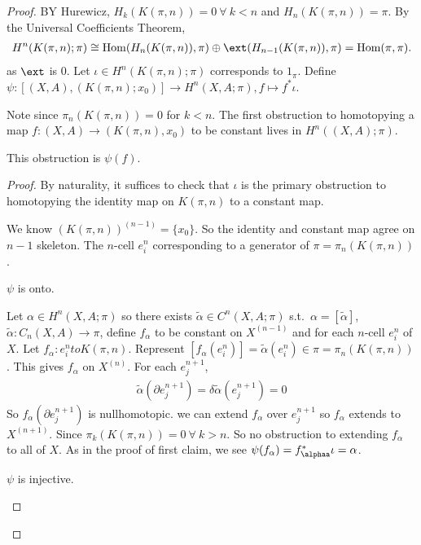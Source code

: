 \documentclass[12pt,class=article,crop=false]{standalone}
\begin{document}
\begin{proof}
BY Hurewicz, $ H_k(K(\pi,n)) = 0 \ \forall \ k<n$ and $ H_n(K(\pi,n)) = \pi$. By the Universal Coefficients Theorem,
\begin{align*}
	H^{n}(K(\pi,n);\pi) \cong \Hom( H_n(K(\pi,n)), \pi) \oplus \ext(H_{n-1}(K(\pi,n)),\pi) = \Hom( \pi, \pi).
\end{align*}
as $ \ext$ is 0. Let $ \iota \in H^{n}(K(\pi,n);\pi)$ corresponds to $ 1_{\pi}$. Define $ \psi: [(X,A),(K(\pi,n);x_0)] \to H^{n}(X,A;\pi), f\mapsto f^* \iota $.

Note since $ \pi_n(K(\pi,n)) =0$ for $ k<n$. The first obstruction to homotopying a map  $ f:(X,A) \to (K(\pi,n),x_0)$ to be constant lives in $ H^{n}((X,A);\pi)$.
\begin{claim}
This obstruction is $ \psi(f)$.
\end{claim}
\begin{proof}
By naturality, it suffices to check that $ \iota $ is the primary obstruction to homotopying the identity map on $ K(\pi,n)$ to a constant map. 

We know $ (K(\pi,n))^{(n-1)} = \{x_0\} $. So the identity and constant map agree on  $ n-1$ skeleton. The  $ n$-cell  $ e_i^{n}$ corresponding to a generator of $ \pi=\pi_n(K(\pi,n))$.

\begin{claim}
$ \psi$ is onto.
\end{claim}
Let $  \alpha \in H^{n}(X,A;\pi)$ so there exists $ \widetilde{ \alpha} \in C^{n}(X,A; \pi)$ s.t.\ $ \alpha=[ \widetilde{ \alpha}]$, $ \widetilde{ \alpha}: C_n(X,A) \to \pi$, define $ f_{ \alpha}$ to be constant on $ X^{(n-1)}$ and for each $ n$-cell  $ e_i^{n}$ of $ X$. Let  $ f_{ \alpha}: e_i^{n} to K(\pi,n)$. Represent $ [f_{ \alpha}(e_i^{n})] = \widetilde{ \alpha}(e_i^{n}) \in \pi = \pi_n(K(\pi,n))$. This gives $ f_{ \alpha}$ on $ X^{(n)}$. For each $ e_j^{n+1}$,
\begin{align*}
	\widetilde{ \alpha}(\partial e_j^{n+1}) = \delta \widetilde{ \alpha}(e_j^{n+1}) = 0
\end{align*}
So $ f_{ \alpha}(\partial  e_j^{n+1})$ is nullhomotopic. we can extend $ f_{ \alpha}$ over $ e_j^{n+1}$ so $ f_{ \alpha}$ extends to $ X^{(n+1)}$. Since $ \pi_k(K(\pi,n)) = 0 \ \forall \ k>n$. So no obstruction to extending $ f_{ \alpha}$  to all of $ X$. As in the proof of first claim, we see  $ \psi(f_{ \alpha}) = f_{ \alphaa}^*  \iota = \alpha$.

\begin{claim}
$ \psi$ is injective.
\end{claim}


\end{proof}
\end{proof}
\end{document}

